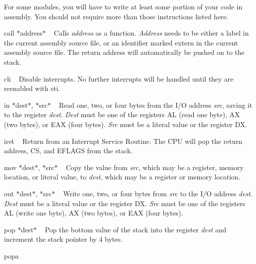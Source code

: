 For some modules, you will have to write at least some portion of your code in assembly. You should not require more than those instructions listed here.


\begin{DoxyItemize}
\item {\ttfamily call $\ast$address$\ast$} ~\newline
 Calls {\itshape address} as a function. {\itshape Address} needs to be either a label in the current assembly source file, or an identifier marked {\ttfamily extern} in the current assembly source file. The return address will automatically be pushed on to the stack.
\item {\ttfamily cli} ~\newline
 Disable interrupts. No further interrupts will be handled until they are reenabled with {\ttfamily sti}.
\item {\ttfamily in $\ast$dest$\ast$, $\ast$src$\ast$} ~\newline
 Read one, two, or four bytes from the I/O address {\itshape src}, saving it to the register {\itshape dest}. {\itshape Dest} must be one of the registers {\ttfamily AL} (read one byte), {\ttfamily AX} (two bytes), or {\ttfamily EAX} (four bytes). {\itshape Src} must be a literal value or the register {\ttfamily DX}.
\item {\ttfamily iret} ~\newline
 Return from an Interrupt Service Routine. The CPU will pop the return address, CS, and EFLAGS from the stack.
\item {\ttfamily mov $\ast$dest$\ast$, $\ast$src$\ast$} ~\newline
 Copy the value from {\itshape src}, which may be a register, memory location, or literal value, to {\itshape dest}, which may be a register or memory location.
\item {\ttfamily out $\ast$dest$\ast$, $\ast$src$\ast$} ~\newline
 Write one, two, or four bytes from {\itshape src} to the I/O address {\itshape dest}. {\itshape Dest} must be a literal value or the register {\ttfamily DX}. {\itshape Src} must be one of the registers {\ttfamily AL} (write one byte), {\ttfamily AX} (two bytes), or {\ttfamily EAX} (four bytes).
\item {\ttfamily pop $\ast$dest$\ast$} ~\newline
 Pop the bottom value of the stack into the register {\itshape dest} and increment the stack pointer by 4 bytes.
\item {\ttfamily popa} ~\newline

\end{DoxyItemize}
